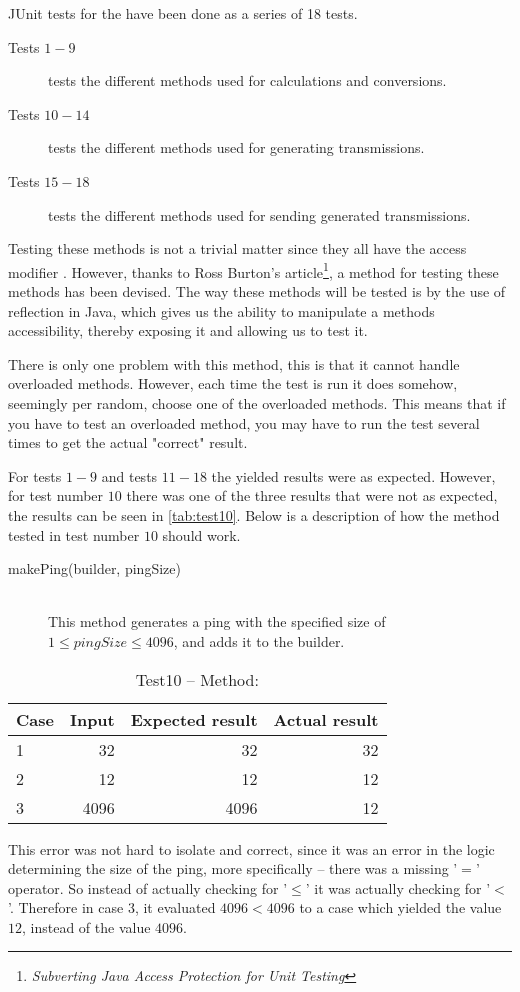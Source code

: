 JUnit tests for the  have been done as a series of 18 tests. %
\begin{description}
	\item[Tests $1-9$] tests the different methods used for calculations and conversions.
	\item[Tests $10-14$] tests the different methods used for generating transmissions.
	\item[Tests $15-18$] tests the different methods used for sending generated transmissions.
\end{description}
Testing these methods is not a trivial matter since they all have the access modifier . However, thanks to Ross Burton's article\footnote{\textit{Subverting Java Access Protection for Unit Testing}\cite{onJava}}, a method for testing these methods has been devised. The way these methods will be tested is by the use of reflection in Java, which gives us the ability to manipulate a methods accessibility, thereby exposing it and allowing us to test it. 

There is only one problem with this method, this is that it cannot handle overloaded methods. However, each time the test is run it does somehow, seemingly per random, choose one of the overloaded methods. This means that if you have to test an overloaded method, you may have to run the test several times to get the actual "correct" result.

For tests $1-9$ and tests $11-18$ the yielded results were as expected. However, for test number $10$ there was one of the three results that were not as expected, the results can be seen in \autoref{tab:test10}. 
Below is a description of how the method tested in test number $10$ should work.
\begin{description}
	\item[makePing(builder, pingSize)] \hfill \\
	This method generates a ping with the specified size of $1\leq pingSize \leq 4096$, and adds it to the builder.
\end{description}
\begin{table}[H]
	\centering
	\begin{tabular}{ l | r | r | r }
		Case & Input & Expected result & Actual result \\
		\hline
		1 & 32 & 32 & 32 \\
		\hline
		2 & 12 & 12 & 12 \\
		\hline
		3 & 4096 & 4096 & 12 \\
	\end{tabular}
	\caption{Test10 -- Method: }
	\label{tab:test10}
\end{table}

This error was not hard to isolate and correct, since it was an error in the logic determining the size of the ping, more specifically -- there was a missing '$=$' operator. So instead of actually checking for '$\leq$' it was actually checking for '$<$'. Therefore in case 3, it evaluated $4096<4096$ to a case which yielded the value $12$, instead of the value $4096$.